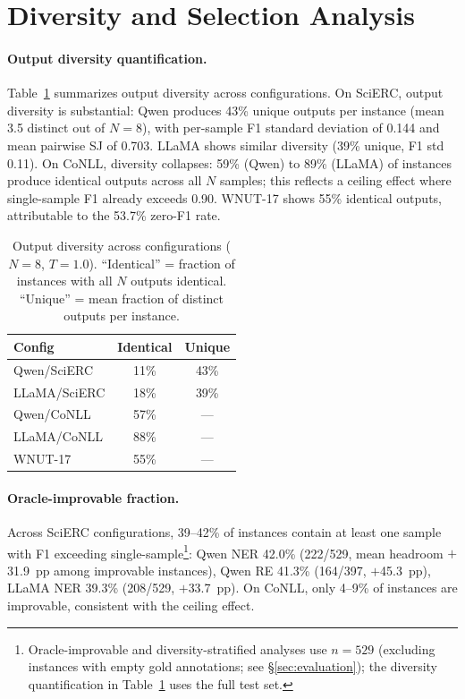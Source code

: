 \section{Diversity and Selection Analysis}\label{app:diversity}


\paragraph{Output diversity quantification.}
Table~\ref{tab:diversity} summarizes output diversity across configurations.
On SciERC, output diversity is substantial: Qwen produces 43\% unique outputs per instance (mean 3.5 distinct out of $N{=}8$), with per-sample F1 standard deviation of 0.144 and mean pairwise SJ of 0.703.
LLaMA shows similar diversity (39\% unique, F1 std 0.11).
On CoNLL, diversity collapses: 59\% (Qwen) to 89\% (LLaMA) of instances produce identical outputs across all $N$ samples; this reflects a ceiling effect where single-sample F1 already exceeds 0.90.
WNUT-17 shows 55\% identical outputs, attributable to the 53.7\% zero-F1 rate.

\begin{table}[t]
\centering
\small
\caption{Output diversity across configurations ($N{=}8$, $T{=}1.0$). ``Identical'' = fraction of instances with all $N$ outputs identical. ``Unique'' = mean fraction of distinct outputs per instance.}
\label{tab:diversity}
\begin{tabular}{lcc}
\toprule
Config & Identical & Unique \\
\midrule
Qwen/SciERC & 11\% & 43\% \\
LLaMA/SciERC & 18\% & 39\% \\
Qwen/CoNLL & 57\% & --- \\
LLaMA/CoNLL & 88\% & --- \\
WNUT-17 & 55\% & --- \\
\bottomrule
\end{tabular}
\end{table}

\paragraph{Oracle-improvable fraction.}
Across SciERC configurations, 39--42\% of instances contain at least one sample with F1 exceeding single-sample\footnote{Oracle-improvable and diversity-stratified analyses use $n{=}529$ (excluding instances with empty gold annotations; see \S\ref{sec:evaluation}); the diversity quantification in Table~\ref{tab:diversity} uses the full test set.}: Qwen NER 42.0\% (222/529, mean headroom $+$31.9~pp among improvable instances), Qwen RE 41.3\% (164/397, $+$45.3~pp), LLaMA NER 39.3\% (208/529, $+$33.7~pp).
On CoNLL, only 4--9\% of instances are improvable, consistent with the ceiling effect.

